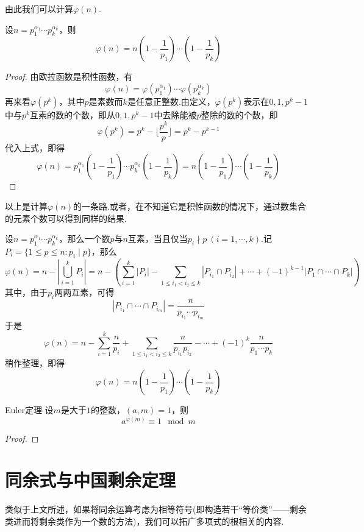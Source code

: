 \documentclass[lang=cn, zihao=5]{elegantbook}
\newcommand{\ssb}[1]{\left( #1 \right)}
\begin{document}
由此我们可以计算$\varphi (n)$.

\begin{theorem}
	设$n=p_1^{\alpha _1} \cdots p_k^{\alpha _k}$，则$$\varphi (n) = n \ssb{1-\frac{1}{p_1}} \cdots \ssb{1-\frac{1}{p_k}}$$
\end{theorem}
\begin{proof}
	由欧拉函数是积性函数，有$$\varphi (n) = \varphi (p_1^{\alpha _1}) \cdots \varphi (p_k^{\alpha _k})$$
	再来看$\varphi (p^k)$，其中$p$是素数而$k$是任意正整数.由定义，$\varphi (p^k)$表示在$0,1,p^k-1$中与$p^k$互素的数的个数，即从$0,1,p^k-1$中去除能被$p$整除的数的个数，即$$\varphi (p^k) = p^k - \lfloor \frac{p^k}{p} \rfloor = p^k - p^{k-1}$$
	代入上式，即得$$\varphi (n) = p_1^{\alpha _1}\ssb{1-\frac{1}{p_1}} \cdots p_k^{\alpha _k}\ssb{1-\frac{1}{p_k}} = n \ssb{1-\frac{1}{p_1}} \cdots \ssb{1-\frac{1}{p_k}}$$
\end{proof}

以上是计算$\varphi (n)$的一条路.或者，在不知道它是积性函数的情况下，通过数集合的元素个数可以得到同样的结果.

设$n=p_1^{\alpha _1} \cdots p_k^{\alpha _k}$，那么一个数$p$与$n$互素，当且仅当$p_i \nmid p~(i=1,\cdots ,k)$.记$P_i=\{ 1\leq p \leq n: p_i \mid p\}$，那么$$\varphi (n) = n - | \bigcup_{i=1}^{k} P_i | = n- \ssb{\sum_{i=1}^{k} |P_i| - \sum_{1\leq i_1 < i_2 \leq k} |P_{i_1} \cap P_{i_2}| + \cdots + (-1)^{k-1} |P_1 \cap \cdots \cap P_k|  }$$
其中，由于$p_i$两两互素，可得$$|P_{i_1} \cap \cdots \cap P_{i_m}| = \frac{n}{p_{i_1} \cdots p_{i_m}}$$
于是$$\varphi (n) = n - \sum_{i=1}^{k} \frac{n}{p_i}  + \sum_{1\leq i_1 < i_2 \leq k} \frac{n}{p_{i_1}p_{i_2}} - \cdots + (-1)^{k} \frac{n}{p_1 \cdots p_k}$$
稍作整理，即得$$\varphi (n) = n \ssb{1-\frac{1}{p_1}} \cdots \ssb{1-\frac{1}{p_k}}$$

\begin{theorem}{Euler定理}
	设$m$是大于$1$的整数，$(a,m)=1$，则$$a^{\varphi (m)} \equiv 1 \mod m$$
\end{theorem}
\begin{proof}
	
\end{proof}

\section{同余式与中国剩余定理}

类似于上文所述，如果将同余运算考虑为相等符号(即构造若干“等价类”——剩余类进而将剩余类作为一个数的方法)，我们可以拓广多项式的根相关的内容.
\end{document}

